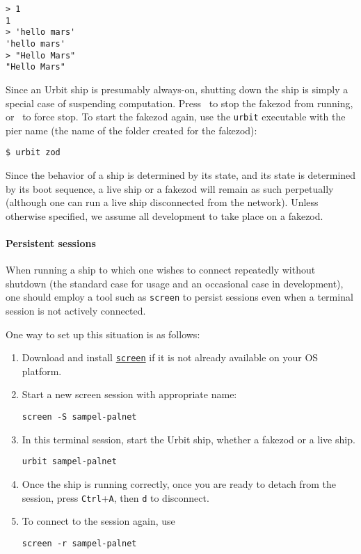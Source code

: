 {{{{\begin{lstlisting}[style=nonumbers]
> 1
1
> 'hello mars'
'hello mars'
> "Hello Mars"
"Hello Mars"
\end{lstlisting}

Since an Urbit ship is presumably always-on, shutting down the ship is simply a special case of suspending computation.  Press \CtrlD~to stop the fakezod from running, or \CtrlZ~to force stop.  To start the fakezod again, use the \texttt{urbit} executable with the pier name (the name of the folder created for the fakezod):

\begin{lstlisting}[style=nonumbers]
$ urbit zod
\end{lstlisting}

Since the behavior of a ship is determined by its state, and its state is determined by its boot sequence, a live ship or a fakezod will remain as such perpetually (although one can run a live ship disconnected from the network).  Unless otherwise specified, we assume all development to take place on a fakezod.

\paragraph{Persistent sessions}

When running a ship to which one wishes to connect repeatedly without shutdown (the standard case for usage and an occasional case in development), one should employ a tool such as \texttt{screen} to persist sessions even when a terminal session is not actively connected.

One way to set up this situation is as follows:

\begin{enumerate}
  \item  Download and install \href{TODO}{\texttt{screen}} if it is not already available on your OS platform.
  \item  Start a new screen session with appropriate name:
    \begin{lstlisting}
screen -S sampel-palnet
    \end{lstlisting}
  \item  In this terminal session, start the Urbit ship, whether a fakezod or a live ship.
    \begin{lstlisting}
urbit sampel-palnet
    \end{lstlisting}
  \item  Once the ship is running correctly, once you are ready to detach from the session, press \texttt{Ctrl}+\texttt{A}, then \texttt{d} to disconnect.
  \item  {}  To connect to the session again, use
    \begin{lstlisting}
screen -r sampel-palnet
    \end{lstlisting}
\end{enumerate}

}}}}
